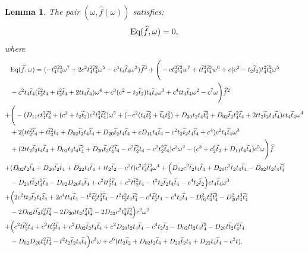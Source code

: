 \documentclass{scrartcl}
\newcommand\wt[1]{\widetilde{#1}}
\newcommand\wh[1]{\widehat{#1}}
\newtheorem{lem}[thm]{Lemma}
\begin{document}
\begin{lem}
The pair $(\omega, \wh{f}(\omega))$ satisfies:
\[
\textnormal{Eq}(\wh{f},\omega)=0,
\]
where
\begin{equation}
\begin{aligned}
&\textnormal{Eq}(\wh{f},\omega)=(-t_4^3\wt{t}_4^3\omega^7 + 2c^2t_4^2\wt{t}_4^2\omega^5 - c^4t_4\wt{t}_4\omega^3)\wh{f}^3+\Bigg(-ct_4^3\wt{t}_4^3w^7 + t\wt{t}_4^3\wt{t}_4^3w^6 + c(c^2 - t_2\wt{t}_2)t_4^2\wt{t}_4^2\omega^5 \\
&- c^2t_4\wt{t}_4(\wt{t}_2^2t_4 + t_2^2\wt{t}_4 + 2tt_4\wt{t}_4)\omega^4 + c^3(c^2 -t_2\wt{t}_2)t_4\wt{t}_4\omega^3 + c^4tt_4\wt{t}_4\omega^2 - c^7\omega   \Bigg)\wh{f}^2\\
+& \Bigg(-(D_{11}ct_4^3\wt{t}_4^3 + (c^2 + t_2\wt{t}_2)c^2t_4^2\wt{t}_4^2)\omega^5 + (-c^2(t_4\wt{t}_2^2 + \wt{t}_4t_2^2) +  D_{20}t_2t_4\wt{t}_4^2 +  D_{02}\wt{t}_2t_4^2\wt{t}_4 + 2tt_2\wt{t}_2t_4 \wt{t}_4)ct_4\wt{t}_4\omega^4 \\
&+ 2(tt_2^2\wt{t}_4+t\wt{t}_2^2t_4+D_{02}\wt{t}_2t_4\wt{t}_4+D_{20}\wt{t}_2t_4\wt{t}_4+cD_{11}t_4\wt{t}_4-c^2t_2\wt{t}_2t_4\wt{t}_4+c^4)c^2t_4\wt{t}_4\omega^3 \\
&+ (2tt_2\wt{t}_2t_4\wt{t}_4+D_{02}t_2t_4\wt{t}_4^2+D_{20}\wt{t}_2t_4^2\wt{t}_4-c^2\wt{t}_2^2t_4-c^2t_2^2\wt{t}_4)c^3\omega^2 - (c^3 + c^t_2\wt{t}_2 + D_{11}t_4\wt{t}_4)c^5\omega\Bigg)\wh{f}\\
+&(D_{02}t_2\wt{t}_4+D_{20}\wt{t}_2t_4+D_{22}t_4\wt{t}_4+tt_2\wt{t}_2-c^2t)c^2t_4^2\wt{t}_4^2\omega^4+\Big(D_{02}c^2\wt{t}_2t_4\wt{t}_4+D_{20}c^2t_2t_4\wt{t}_4-D_{02}tt_2t_4\wt{t}_4^2\\
&-D_{20}t\wt{t}_2t_4^2\wt{t}_4-D_{02}D_{20}t_4\wt{t}_4+c^2tt_2^2\wt{t}_4+c^2t\wt{t}_2^2t_4-t^2t_2\wt{t}_2t_4\wt{t}_4-c^4t_2\wt{t}_2\Big)ct_4\wt{t}_4\omega^3\\
+&\Big(2c^2tt_2\wt{t}_2t_4\wt{t}_4+2c^4tt_4\wt{t}_4-t^2\wt{t}_2^2t_4^2\wt{t}_4-t^2t_2^2t_4\wt{t}_4^2-c^4\wt{t}_2^2t_4-c^4t_2\wt{t}_4-D_{02}^2t_4^2\wt{t}_4^3-D_{20}^2t_4^3\wt{t}_4^2\\
&-2D_{02}t\wt{t}_2t_4^2\wt{t}_4^2-2D_{20}tt_2t_4^2\wt{t}_4^2-2D_{22}c^2t_4^2\wt{t}_4^2\Big)c^2\omega^2\\
+&\Big(c^2t\wt{t}_2^2t_4+c^2tt_2^2\wt{t}_4+c^2D_{02}\wt{t}_2t_4\wt{t}_4+c^2D_{20}t_2t_4\wt{t}_4-c^4t_2\wt{t}_2-D_{02}tt_2t_4\wt{t}_4^2-D_{20}t\wt{t}_2t_4^2\wt{t}_4\\
&-D_{02}D_{20}t_4^2\wt{t}_4^2-t^2t_2\wt{t}_2t_4\wt{t}_4\Big)c^3\omega +c^6(tt_2\wt{t}_2+D_{02}t_2\wt{t}_4+D_{20}\wt{t}_2t_4+D_{22}t_4\wt{t}_4-c^2t).
\end{aligned}
\label{eq:master-equation-Ising-quadrangulations-dij}
\end{equation}
\end{lem}
\end{document}

